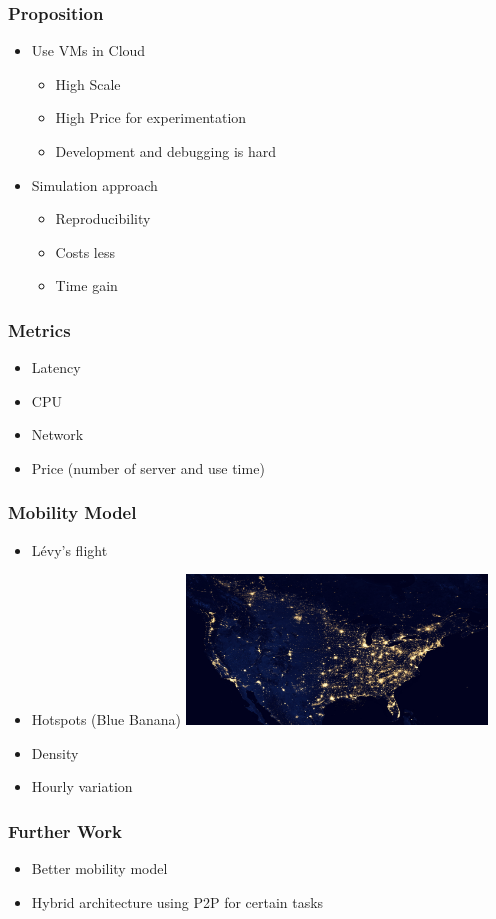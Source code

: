 \documentclass{beamer}
\begin{document}
\begin{frame}
  \frametitle{Proposition}
  \begin{itemize}
    \item{Use VMs in Cloud}
    \begin{itemize}
      \item{High Scale}
      \item{High Price for experimentation}
      \item{Development and debugging is hard\vspace{5mm}}
    \end{itemize}
    \item{Simulation approach}
    \begin{itemize}
      \item{Reproducibility}
      \item{Costs less}
      \item{Time gain}
    \end{itemize}
  \end{itemize}
\end{frame}

\begin{frame}
  \frametitle{Metrics}
  \begin{itemize}
    \item{Latency\vspace{2mm}}
    \item{CPU\vspace{2mm}}
    \item{Network\vspace{2mm}}
    \item{Price (number of server and use time)\vspace{2mm}}
  \end{itemize}
\end{frame}

\begin{frame}
  \frametitle{Mobility Model}
  \begin{itemize}
    \item{Lévy's flight}
    \item{Hotspots (Blue Banana)\vspace{2mm}}
    \includegraphics[width=8cm]{usa_by_night.jpg}\\
    \item{Density}
    \item{Hourly variation}
  \end{itemize}
\end{frame}

\begin{frame}
  \frametitle{Further Work}
  \begin{itemize}
    \item{Better mobility model\vspace{1cm}}
    \item{Hybrid architecture using P2P for certain tasks}
  \end{itemize}
\end{frame}
\end{document}
